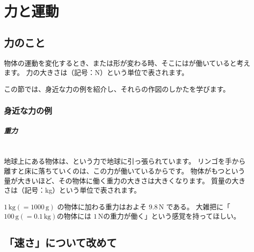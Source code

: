 \chapter{力と運動}

\section{力のこと}

物体の運動を変化するとき、または形が変わる時、そこにはが働いていると考えます。
力の大きさは（記号：$\mathrm{N}$）という単位で表されます。

この節では、身近な力の例を紹介し、それらの作図のしかたを学びます。

\subsection{身近な力の例}

\paragraph{重力}
\mbox{}\\
\indent
地球上にある物体は、という力で地球に引っ張られています。
リンゴを手から離すと床に落ちていくのは、この力が働いているからです。
物体がもつという量が大きいほど、その物体に働く重力の大きさは大きくなります。
質量の大きさは（記号：kg）という単位で表されます。

$1\,\mathrm{kg} (= 1000\,\mathrm{g})$ の物体に加わる重力はおよそ $9.8\,\mathrm{N}$ である。
大雑把に「$100\,\mathrm{g} (= 0.1\,\mathrm{kg})$の物体には $1\,\mathrm{N}$の重力が働く」という感覚を持ってほしい。

\section{「速さ」について改めて}

